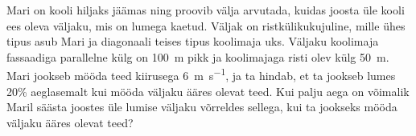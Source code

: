 
Mari on kooli hiljaks jäämas ning proovib välja arvutada, kuidas joosta üle kooli ees oleva väljaku, mis on lumega kaetud. Väljak on ristkülikukujuline, mille ühes tipus asub Mari ja diagonaali teises tipus koolimaja uks. Väljaku koolimaja fassaadiga parallelne külg on \SI{100}{\metre} pikk ja koolimajaga risti olev külg \SI{50}{\metre}. Mari jookseb mööda teed kiirusega \SI{6}{\metre\per\second}, ja ta hindab, et ta jookseb lumes 20\% aeglasemalt kui mööda väljaku ääres olevat teed. Kui palju aega on võimalik Maril säästa joostes üle lumise väljaku võrreldes sellega, kui ta jookseks mööda väljaku ääres olevat teed?


\hint

